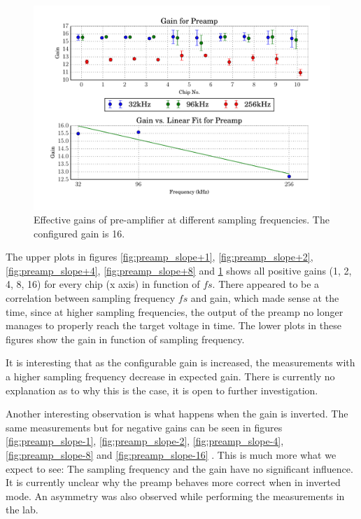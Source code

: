 \begin{figure}
    \centering
    \includegraphics[width=\linewidth]{images/plots/dc_slope_preamp_gain+16.pdf}
    \caption{Effective gains of pre-amplifier at different sampling frequencies. The configured gain is 16.}
    \label{fig:preamp_slope+16}
\end{figure}

The upper plots in figures \ref{fig:preamp_slope+1}, \ref{fig:preamp_slope+2},
\ref{fig:preamp_slope+4},             \ref{fig:preamp_slope+8}             and
\ref{fig:preamp_slope+16} shows all positive  gains (1, 2, 4, 8, 16) for every
chip (x axis)  in function of $fs$. There appeared to be a correlation between
sampling frequency $fs$  and  gain,  which  made  sense  at the time, since at
higher sampling  frequencies,  the  output  of the preamp no longer manages to
properly reach the  target  voltage  in time. The lower plots in these figures
show the gain in function of sampling frequency.

It is interesting that as the configurable gain is increased, the measurements
with a higher sampling frequency decrease in expected gain. There is currently
no  explanation  as  to  why  this  is  the  case,  it   is  open  to  further
investigation.

Another interesting observation is what happens when the gain is inverted. The
same  measurements  but  for   negative   gains   can   be   seen  in  figures
\ref{fig:preamp_slope-1}, \ref{fig:preamp_slope-2},  \ref{fig:preamp_slope-4},
\ref{fig:preamp_slope-8} and  \ref{fig:preamp_slope-16}  .  This  is much more
what we expect to see: The sampling frequency and the gain have no significant
influence. It is currently unclear why the preamp behaves more correct when in
inverted  mode.   An   asymmetry   was  also  observed  while  performing  the
measurements in the lab.

